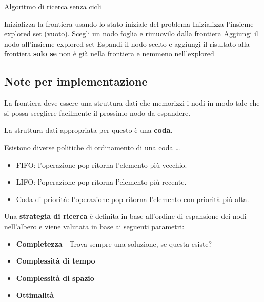 \begin{algorithm}
    \caption{Algoritmo di ricerca senza cicli}
    \label{alg:search}
    \begin{algorithmic}[1] %
         
			\State Inizializza la frontiera usando lo stato iniziale del problema
			\State Inizializza l'insieme explored set (vuoto).
            \Loop
              \EndIf
            \State Scegli un nodo foglia e rimuovilo dalla frontiera
              \EndIf
			\State Aggiungi il nodo all'insieme explored set
            \State Espandi il nodo scelto e aggiungi il risultato alla frontiera \textbf{solo se}
non è già nella frontiera e nemmeno nell'explored 
			\EndLoop
        \EndProcedure
    \end{algorithmic}
\end{algorithm}

\subsection{Note per implementazione}

La frontiera deve essere una struttura dati che memorizzi i nodi in modo tale che si possa scegliere
facilmente il prossimo nodo da espandere.

La struttura dati appropriata per questo è una \textbf{coda}.

Esistono diverse politiche di ordinamento di una coda \dots

\begin{itemize}
\item FIFO: l'operazione pop ritorna l'elemento più vecchio.
\item LIFO: l'operazione pop ritorna l'elemento più recente.
\item Coda di priorità: l'operazione pop ritorna l'elemento con priorità più alta.
\end{itemize}

Una \textbf{strategia di ricerca} è definita in base all'ordine di espansione dei nodi nell'albero
e viene valutata in base ai seguenti parametri:

\begin{itemize}
\item \textbf{Completezza} - Trova sempre una soluzione, se questa esiste?
\item \textbf{Complessità di tempo}
\item \textbf{Complessità di spazio}
\item \textbf{Ottimalità}
\end{itemize}
